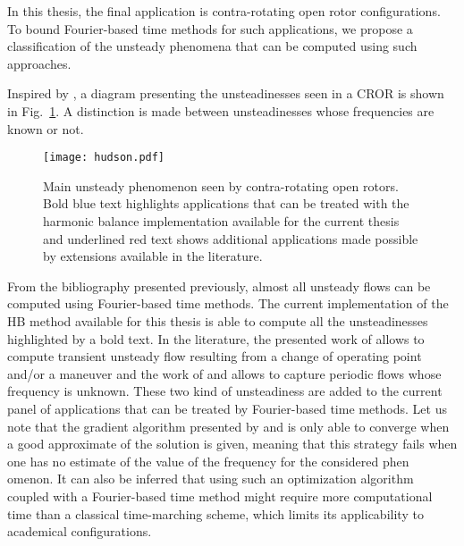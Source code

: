 
In this thesis, the final application is contra-rotating open rotor
configurations. To bound Fourier-based time methods for such
applications, we propose a classification of the
unsteady phenomena that can be computed using such approaches.

Inspired by \citet{Hodson1998},
a diagram presenting the unsteadinesses seen in 
a CROR is shown in Fig.~\ref{fig:hudson}. A distinction
is made between unsteadinesses whose frequencies are
known or not.
\begin{figure}[htp]
  \centering
  \texttt{[image: hudson.pdf]}
  \caption{Main unsteady phenomenon seen by contra-rotating
  open rotors. Bold blue text highlights applications that can
  be treated with the harmonic balance implementation available for the
  current thesis and underlined red text shows additional applications
  made possible by extensions available in the literature.}
  \label{fig:hudson}
\end{figure}
From the bibliography presented previously, almost all
unsteady flows can be computed using Fourier-based time methods.
The current implementation of the HB method available for
this thesis is able to compute all the unsteadinesses highlighted
by a bold text. In the literature, the presented work of 
\citet{Mavriplis2012} allows to compute transient unsteady flow
resulting from a change of operating point and/or a maneuver and
the work of \citet{McMullen2002} and \citet{Gopinath2006} allows
to capture periodic flows whose frequency is unknown. These two
kind of unsteadiness are added
to the current panel of applications that can
be treated by Fourier-based time methods. Let us note
that the gradient algorithm presented by \citet{McMullen2002}
and \citet{Gopinath2006} is only able to converge when a 
good approximate of the solution is given, meaning
that this strategy fails when one has no estimate
of the value of the frequency for the considered phen	omenon.
It can also be inferred that using such an optimization algorithm
coupled with a Fourier-based time method
might require more computational time than a classical time-marching scheme,
which limits its applicability to academical configurations.

